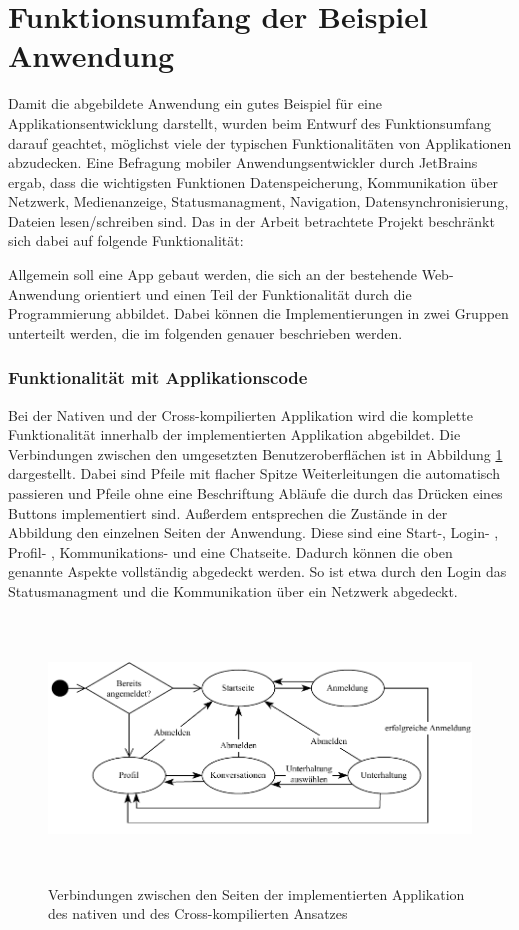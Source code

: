 \section{Funktionsumfang der Beispiel Anwendung}
Damit die abgebildete Anwendung ein gutes Beispiel für eine Applikationsentwicklung darstellt, wurden beim Entwurf des Funktionsumfang darauf geachtet, möglichst viele der typischen Funktionalitäten von Applikationen abzudecken. Eine Befragung \cite{JetBrains_miscellaneous_2021} mobiler Anwendungsentwickler durch JetBrains ergab, dass die wichtigsten Funktionen Datenspeicherung, Kommunikation über Netzwerk, Medienanzeige, Statusmanagment, Navigation, Datensynchronisierung, Dateien lesen/schreiben sind.
Das in der Arbeit betrachtete Projekt beschränkt sich dabei auf folgende Funktionalität:

Allgemein soll eine App gebaut werden, die sich an der bestehende Web-Anwendung orientiert und einen Teil der Funktionalität durch die Programmierung abbildet. Dabei können die Implementierungen in zwei Gruppen unterteilt werden, die im folgenden genauer beschrieben werden.

\subsubsection{Funktionalität mit Applikationscode}
Bei der Nativen und der Cross-kompilierten Applikation wird die komplette Funktionalität innerhalb der implementierten Applikation abgebildet. Die Verbindungen zwischen den umgesetzten Benutzeroberflächen ist in Abbildung \ref{fig:pageflow} dargestellt. Dabei sind Pfeile mit flacher Spitze Weiterleitungen die automatisch passieren und Pfeile ohne eine Beschriftung Abläufe die durch das Drücken eines Buttons implementiert sind. Außerdem entsprechen die Zustände in der Abbildung den einzelnen Seiten der Anwendung. Diese sind eine Start-, Login- , Profil- , Kommunikations- und eine Chatseite. Dadurch können die oben genannte Aspekte vollständig abgedeckt werden. So ist etwa durch den Login das Statusmanagment und die Kommunikation über ein Netzwerk abgedeckt. 

\begin{figure}[ht]
  \centering
  \includegraphics[height=7cm,keepaspectratio]{images/Pageflow_native_flutter.drawio.pdf} 
  \caption[Seitenablauf der implemierten nativen und Cross-kompilierten Applikation]{Verbindungen zwischen den Seiten der implementierten Applikation des nativen und des Cross-kompilierten Ansatzes}
  \label{fig:pageflow}
\end{figure}

